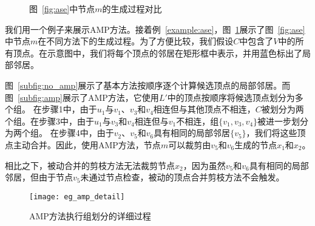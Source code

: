 \begin{figure} 
	\centering
	
	 \quad

	\caption{图~\ref{fig:ase}中节点$m$的生成过程对比}
  \vspace{-0.05in}
	\label{fig:amp}

\end{figure}

\begin{example}
  我们用一个例子来展示AMP方法。接着例~\ref{example:ase}，图~\ref{fig:amp}展示了图~\ref{fig:ase}中节点$m$在不同方法下的生成过程。为了方便比较，我们假设$C$中包含了$V$中的所有顶点。在示意图中，我们将每个顶点的邻居在矩形框中表示，并用蓝色标出了局部邻居。

  图~\ref{subfig:no_amp}展示了基本方法按顺序逐个计算候选顶点的局部邻居。而图~\ref{subfig:amp}展示了AMP方法，它使用$L'$中的顶点按顺序将候选顶点划分为多个组。  在步骤\Num1中，由于$u_1$与$v_1$、$v_3$和$v_4$相连但与其他顶点不相连，$C$被划分为两个组。在步骤\Num3中，由于$u_1$与$v_3$和$v_4$相连但与$v_1$不相连，组$\{v_1, v_3, v_4\}$被进一步划分为两个组。
在步骤\Num4中，由于$v_2$、$v_5$和$v_6$具有相同的局部邻居$\{v_5\}$，我们将这些顶点主动合并。因此，使用AMP方法，节点$m$可以裁剪由$v_5$和$v_6$生成的节点$x_1$和$x_2$。

相比之下，被动合并的剪枝方法无法裁剪节点$x_2$，因为虽然$v_5$和$v_6$具有相同的局部邻居，但由于节点$v_5$未通过节点检查，被动的顶点合并剪枝方法不会触发。

\label{example:amp}
\end{example}

\vspace{-0.2in}

\begin{figure} 
	\centering
	
  \texttt{[image: eg\_amp\_detail]}
	\caption{AMP方法执行组划分的详细过程}
	\label{fig:amp_detail}

\end{figure}


